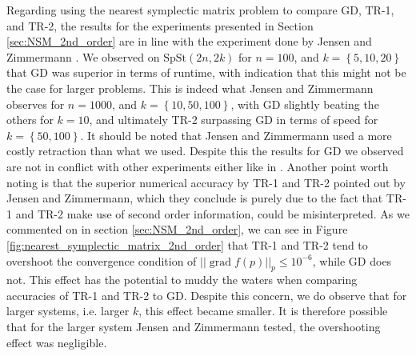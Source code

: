 Regarding using the nearest symplectic matrix problem to compare GD, TR-1, and TR-2, the results for the experiments presented in Section \ref{sec:NSM_2nd_order} are in line with the experiment done by Jensen and Zimmermann \cite[Tbl.~4.1]{JensenZimmermann2024}. We observed on $\mathrm{SpSt}(2n, 2k)$ for $n=100$, and $k=\left\{ 5,10,20 \right\}$ that GD was superior in terms of runtime, with indication that this might not be the case for larger problems. This is indeed what Jensen and Zimmermann observes for $n=1000$, and $k=\left\{ 10,50,100 \right\}$, with GD slightly beating the others for $k=10$, and ultimately TR-2 surpassing GD in terms of speed for $k=\left\{ 50,100 \right\}$. It should be noted that Jensen and Zimmermann used a more costly retraction \cite[Fig.~1]{JensenZimmermann2024} than what we used. Despite this the results for GD we observed are  not in conflict with other experiments either like in \cite[Tbl.~1]{BendokatZimmermann2021}. Another point worth noting is that the superior numerical accuracy by TR-1 and TR-2 pointed out by Jensen and Zimmermann, which they conclude is purely due to the fact that TR-1 and TR-2 make use of second order information, could be misinterpreted. As we commented on in section \ref{sec:NSM_2nd_order}, we can see in Figure \ref{fig:nearest_symplectic_matrix_2nd_order} that TR-1 and TR-2 tend to overshoot the convergence condition of $\lvert \lvert \operatorname{grad}f(p) \rvert \rvert_{p}\leq10^{-6}$, while GD does not. This effect has the potential to muddy the waters when comparing accuracies of TR-1 and TR-2 to GD. Despite this concern, we do observe that for larger systems, i.e. larger $k$, this effect became smaller. It is therefore possible that for the larger system Jensen and Zimmermann tested, the overshooting effect was negligible.

